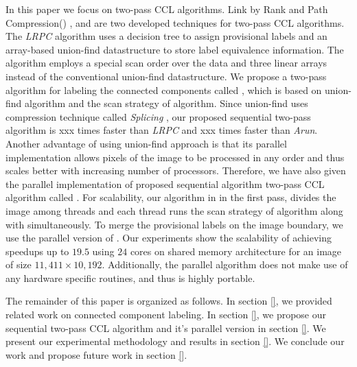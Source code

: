 In this paper we focus on two-pass CCL algorithms. Link by Rank and Path Compression(\lrpc) \cite{}, and \arun \cite{}
are two developed techniques for two-pass CCL algorithms.
The {\em LRPC} algorithm uses a decision tree to assign provisional labels and an array-based union-find datastructure
to store label equivalence information. The \arun algorithm employs a special scan order over the data and three linear
arrays instead of the conventional union-find datastructure. 
We propose a two-pass algorithm for labeling the connected components called \aremsp, which is based on \rems union-find algorithm \cite{}
and the scan strategy of \arun algorithm. Since \rems union-find uses compression technique called {\em Splicing} \cite{},
our proposed sequential two-pass algorithm \aremsp is xxx times faster than {\em LRPC} and xxx times faster than {\em Arun}.
Another advantage of using \rems union-find approach is that its parallel implementation allows pixels of the image to be
processed in any order and thus scales better with increasing number of processors. Therefore, we have also given the parallel implementation of proposed
sequential algorithm two-pass CCL algorithm called \paremsp. For scalability, our algorithm in in the first pass, divides the image among threads
and each thread runs the scan strategy of \arun algorithm along with \remsp simultaneously. To merge the provisional labels on the image boundary,
we use the parallel version of \remsp \cite{}. Our experiments show the scalability of \paremsp achieving speedups up to $19.5$ using $24$ cores
on shared memory architecture for an image of size $11,411 \times 10,192$.
Additionally, the parallel algorithm does not make use of any hardware specific routines, and thus is highly portable.

The remainder of this paper is organized as follows. In section \ref{}, we provided related work on connected component labeling.
In section \ref{}, we propose our sequential two-pass CCL algorithm \aremsp and it's parallel version in section \ref{}. We present our experimental
methodology and results in section \ref{}. We conclude our work
and propose future work in section \ref{}.


